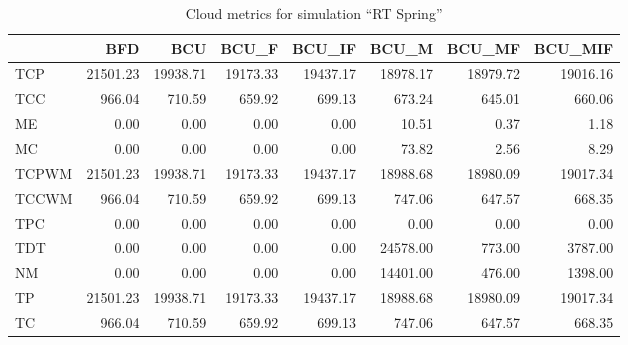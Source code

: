 \begin{table}[ht]
\centering
\begin{tabular}{lrrrrrrr}
\toprule
{} &       BFD &       BCU &     BCU\_F &    BCU\_IF &     BCU\_M &    BCU\_MF &   BCU\_MIF \\
\midrule
TCP   &  21501.23 &  19938.71 &  19173.33 &  19437.17 &  18978.17 &  18979.72 &  19016.16 \\
TCC   &    966.04 &    710.59 &    659.92 &    699.13 &    673.24 &    645.01 &    660.06 \\
ME    &      0.00 &      0.00 &      0.00 &      0.00 &     10.51 &      0.37 &      1.18 \\
MC    &      0.00 &      0.00 &      0.00 &      0.00 &     73.82 &      2.56 &      8.29 \\
TCPWM &  21501.23 &  19938.71 &  19173.33 &  19437.17 &  18988.68 &  18980.09 &  19017.34 \\
TCCWM &    966.04 &    710.59 &    659.92 &    699.13 &    747.06 &    647.57 &    668.35 \\
TPC   &      0.00 &      0.00 &      0.00 &      0.00 &      0.00 &      0.00 &      0.00 \\
TDT   &      0.00 &      0.00 &      0.00 &      0.00 &  24578.00 &    773.00 &   3787.00 \\
NM    &      0.00 &      0.00 &      0.00 &      0.00 &  14401.00 &    476.00 &   1398.00 \\
TP    &  21501.23 &  19938.71 &  19173.33 &  19437.17 &  18988.68 &  18980.09 &  19017.34 \\
TC    &    966.04 &    710.59 &    659.92 &    699.13 &    747.06 &    647.57 &    668.35 \\
\bottomrule
\end{tabular}
\caption{Cloud metrics for simulation "`RT Spring"'}
\end{table}


